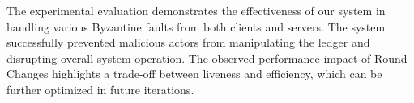 The experimental evaluation demonstrates the effectiveness of our system in handling various Byzantine faults from both clients and servers. The system successfully prevented malicious actors from manipulating the ledger and disrupting overall system operation. The observed performance impact of Round Changes highlights a trade-off between liveness and efficiency, which can be further optimized in future iterations.






